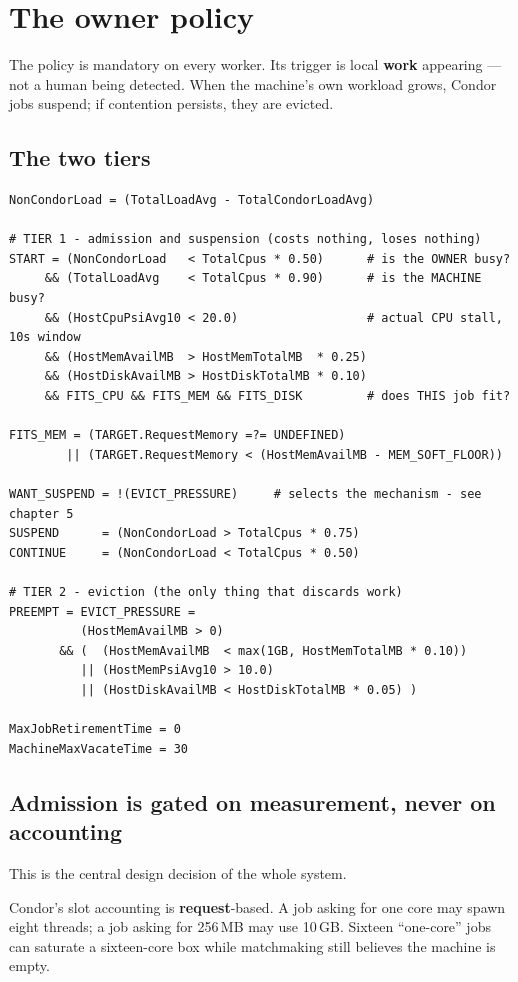 \chapter{The owner policy}
\label{ch:policy}

The policy is mandatory on every worker. Its trigger is local \textbf{work}
appearing --- not a human being detected. When the machine's own workload grows,
Condor jobs suspend; if contention persists, they are evicted.

\section{The two tiers}

\begin{lstlisting}
NonCondorLoad = (TotalLoadAvg - TotalCondorLoadAvg)

# TIER 1 - admission and suspension (costs nothing, loses nothing)
START = (NonCondorLoad   < TotalCpus * 0.50)      # is the OWNER busy?
     && (TotalLoadAvg    < TotalCpus * 0.90)      # is the MACHINE busy?
     && (HostCpuPsiAvg10 < 20.0)                  # actual CPU stall, 10s window
     && (HostMemAvailMB  > HostMemTotalMB  * 0.25)
     && (HostDiskAvailMB > HostDiskTotalMB * 0.10)
     && FITS_CPU && FITS_MEM && FITS_DISK         # does THIS job fit?

FITS_MEM = (TARGET.RequestMemory =?= UNDEFINED)
        || (TARGET.RequestMemory < (HostMemAvailMB - MEM_SOFT_FLOOR))

WANT_SUSPEND = !(EVICT_PRESSURE)     # selects the mechanism - see chapter 5
SUSPEND      = (NonCondorLoad > TotalCpus * 0.75)
CONTINUE     = (NonCondorLoad < TotalCpus * 0.50)

# TIER 2 - eviction (the only thing that discards work)
PREEMPT = EVICT_PRESSURE =
          (HostMemAvailMB > 0)
       && (  (HostMemAvailMB  < max(1GB, HostMemTotalMB * 0.10))
          || (HostMemPsiAvg10 > 10.0)
          || (HostDiskAvailMB < HostDiskTotalMB * 0.05) )

MaxJobRetirementTime = 0
MachineMaxVacateTime = 30
\end{lstlisting}

\section{Admission is gated on measurement, never on accounting}

This is the central design decision of the whole system.

\begin{keypoint}
Condor's slot accounting is \textbf{request}-based. A job asking for one core may
spawn eight threads; a job asking for 256\,MB may use 10\,GB. Sixteen
``one-core'' jobs can saturate a sixteen-core box while matchmaking still
believes the machine is empty.
\end{keypoint}

